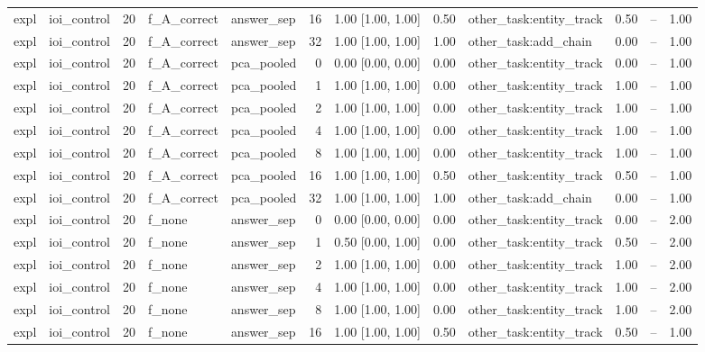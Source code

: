 \begin{tabular}{llrllrrrlrrr}
expl & ioi\_control & 20 & f\_A\_correct & answer\_sep & 16 & 1.00 [1.00, 1.00] & 0.50 & other\_task:entity\_track & 0.50 & -- & 1.00 \\
expl & ioi\_control & 20 & f\_A\_correct & answer\_sep & 32 & 1.00 [1.00, 1.00] & 1.00 & other\_task:add\_chain & 0.00 & -- & 1.00 \\
expl & ioi\_control & 20 & f\_A\_correct & pca\_pooled & 0 & 0.00 [0.00, 0.00] & 0.00 & other\_task:entity\_track & 0.00 & -- & 1.00 \\
expl & ioi\_control & 20 & f\_A\_correct & pca\_pooled & 1 & 1.00 [1.00, 1.00] & 0.00 & other\_task:entity\_track & 1.00 & -- & 1.00 \\
expl & ioi\_control & 20 & f\_A\_correct & pca\_pooled & 2 & 1.00 [1.00, 1.00] & 0.00 & other\_task:entity\_track & 1.00 & -- & 1.00 \\
expl & ioi\_control & 20 & f\_A\_correct & pca\_pooled & 4 & 1.00 [1.00, 1.00] & 0.00 & other\_task:entity\_track & 1.00 & -- & 1.00 \\
expl & ioi\_control & 20 & f\_A\_correct & pca\_pooled & 8 & 1.00 [1.00, 1.00] & 0.00 & other\_task:entity\_track & 1.00 & -- & 1.00 \\
expl & ioi\_control & 20 & f\_A\_correct & pca\_pooled & 16 & 1.00 [1.00, 1.00] & 0.50 & other\_task:entity\_track & 0.50 & -- & 1.00 \\
expl & ioi\_control & 20 & f\_A\_correct & pca\_pooled & 32 & 1.00 [1.00, 1.00] & 1.00 & other\_task:add\_chain & 0.00 & -- & 1.00 \\
expl & ioi\_control & 20 & f\_none & answer\_sep & 0 & 0.00 [0.00, 0.00] & 0.00 & other\_task:entity\_track & 0.00 & -- & 2.00 \\
expl & ioi\_control & 20 & f\_none & answer\_sep & 1 & 0.50 [0.00, 1.00] & 0.00 & other\_task:entity\_track & 0.50 & -- & 2.00 \\
expl & ioi\_control & 20 & f\_none & answer\_sep & 2 & 1.00 [1.00, 1.00] & 0.00 & other\_task:entity\_track & 1.00 & -- & 2.00 \\
expl & ioi\_control & 20 & f\_none & answer\_sep & 4 & 1.00 [1.00, 1.00] & 0.00 & other\_task:entity\_track & 1.00 & -- & 2.00 \\
expl & ioi\_control & 20 & f\_none & answer\_sep & 8 & 1.00 [1.00, 1.00] & 0.00 & other\_task:entity\_track & 1.00 & -- & 2.00 \\
expl & ioi\_control & 20 & f\_none & answer\_sep & 16 & 1.00 [1.00, 1.00] & 0.50 & other\_task:entity\_track & 0.50 & -- & 1.00 \\

\end{tabular}
